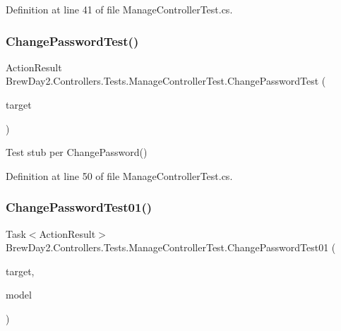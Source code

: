 Definition at line 41 of file Manage\+Controller\+Test.\+cs.

\mbox{\label{class_brew_day2_1_1_controllers_1_1_tests_1_1_manage_controller_test_ac1d0fa318e290f268adf907fb10fd139}} 
\subsubsection{\texorpdfstring{Change\+Password\+Test()}{ChangePasswordTest()}}
{\footnotesize\ttfamily Action\+Result Brew\+Day2.\+Controllers.\+Tests.\+Manage\+Controller\+Test.\+Change\+Password\+Test (\begin{DoxyParamCaption}\item[{\mbox{[}\+Pex\+Assume\+Under\+Test\mbox{]} \mbox{\hyperlink{class_brew_day2_1_1_controllers_1_1_manage_controller}{Manage\+Controller}}}]{target }\end{DoxyParamCaption})}



Test stub per Change\+Password()



Definition at line 50 of file Manage\+Controller\+Test.\+cs.

\mbox{\label{class_brew_day2_1_1_controllers_1_1_tests_1_1_manage_controller_test_ab1ee5ee2dddefa4fd054a4d5cd687881}} 
\subsubsection{\texorpdfstring{Change\+Password\+Test01()}{ChangePasswordTest01()}}
{\footnotesize\ttfamily Task$<$Action\+Result$>$ Brew\+Day2.\+Controllers.\+Tests.\+Manage\+Controller\+Test.\+Change\+Password\+Test01 (\begin{DoxyParamCaption}\item[{\mbox{[}\+Pex\+Assume\+Under\+Test\mbox{]} \mbox{\hyperlink{class_brew_day2_1_1_controllers_1_1_manage_controller}{Manage\+Controller}}}]{target,  }\item[{\mbox{\hyperlink{class_brew_day2_1_1_models_1_1_change_password_view_model}{Change\+Password\+View\+Model}}}]{model }\end{DoxyParamCaption})}



